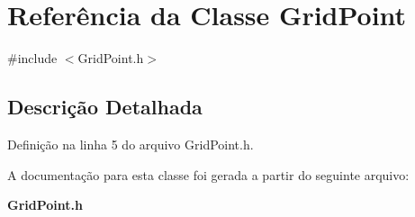 \section{Referência da Classe Grid\+Point}
\label{class_grid_point}


{\ttfamily \#include $<$Grid\+Point.\+h$>$}



\subsection{Descrição Detalhada}


Definição na linha 5 do arquivo Grid\+Point.\+h.



A documentação para esta classe foi gerada a partir do seguinte arquivo\+:\begin{DoxyCompactItemize}
\item 
{\bf Grid\+Point.\+h}\end{DoxyCompactItemize}
